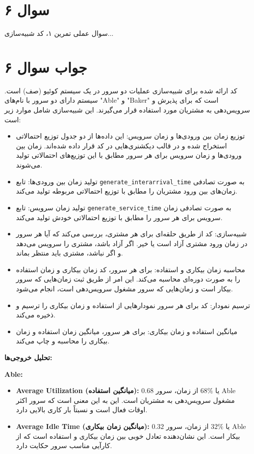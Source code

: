 \section*{سوال ۶}

سوال عملی تمرین ۱، کد شبیه‌سازی...
\section*{جواب سوال ۶}

کد ارائه شده برای شبیه‌سازی عملیات دو سرور در یک سیستم کوئیو (صف) است. سیستم دارای دو سرور با نام‌های "Able" و "Baker" است که برای پذیرش و سرویس‌دهی به مشتریان مورد استفاده قرار می‌گیرند. این شبیه‌سازی شامل موارد زیر است:

\begin{itemize}
	\item توزیع زمان بین ورودی‌ها و زمان سرویس: این داده‌ها از دو جدول توزیع احتمالاتی استخراج شده و در قالب دیکشنری‌هایی در کد قرار داده شده‌اند. زمان بین ورودی‌ها و زمان سرویس برای هر سرور مطابق با این توزیع‌های احتمالاتی تولید می‌شوند.
	\item تولید زمان بین ورودی‌ها: تابع \texttt{generate\_interarrival\_time} به صورت تصادفی زمان‌های بین ورود مشتریان را مطابق با توزیع احتمالاتی مربوطه تولید می‌کند.
	\item تولید زمان سرویس: تابع \texttt{generate\_service\_time} به صورت تصادفی زمان سرویس برای هر سرور را مطابق با توزیع احتمالاتی خودش تولید می‌کند.
	\item شبیه‌سازی: کد از طریق حلقه‌ای برای هر مشتری، بررسی می‌کند که آیا هر سرور در زمان ورود مشتری آزاد است یا خیر. اگر آزاد باشد، مشتری را سرویس می‌دهد و اگر نباشد، مشتری باید منتظر بماند.
	\item محاسبه زمان بیکاری و استفاده: برای هر سرور، کد زمان بیکاری و زمان استفاده را به صورت دوره‌ای محاسبه می‌کند. این امر از طریق ثبت زمان‌هایی که سرور بیکار است و زمان‌هایی که سرور مشغول سرویس‌دهی است، انجام می‌شود.
	\item ترسیم نمودار: کد برای هر سرور نمودارهایی از استفاده و زمان بیکاری را ترسیم و ذخیره می‌کند.
	\item میانگین استفاده و زمان بیکاری: برای هر سرور، میانگین زمان استفاده و زمان بیکاری را محاسبه و چاپ می‌کند.
\end{itemize}

\textbf{تحلیل خروجی‌ها:}

\textbf{Able:}
\begin{itemize}
	\item \textbf{Average Utilization (میانگین استفاده):} \(0.68\) یا \(68\%\) از زمان، سرور Able مشغول سرویس‌دهی به مشتریان است. این به این معنی است که سرور اکثر اوقات فعال است و نسبتاً بار کاری بالایی دارد.
	\item \textbf{Average Idle Time (میانگین زمان بیکاری):} \(0.32\) یا \(32\%\) از زمان، سرور Able بیکار است. این نشان‌دهنده تعادل خوبی بین زمان بیکاری و استفاده است که از کارآیی مناسب سرور حکایت دارد.
\end{itemize}

